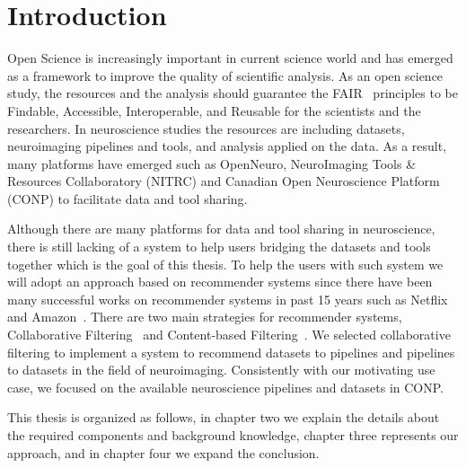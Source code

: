 \chapter{Introduction}
\label{introduction}


Open Science is increasingly important in current science world and has emerged as a framework to improve the quality of scientific analysis. As an open science study, the resources and the analysis should guarantee the FAIR~\cite{wilkinson2016fair} principles to be Findable, Accessible, Interoperable, and Reusable for the scientists and the researchers. In neuroscience studies the resources are including datasets, neuroimaging pipelines and tools, and analysis applied on the data. As a result, many platforms have emerged such as OpenNeuro, NeuroImaging Tools \& Resources Collaboratory (NITRC) and Canadian Open Neuroscience Platform (CONP) to facilitate data and tool sharing.

Although there are many platforms for data and tool sharing in neuroscience, there is still lacking of a system to help users  bridging the datasets and tools together which is the goal of this thesis. To help the users with such system we will adopt an approach based on recommender systems since there have been many successful works on recommender systems in past 15 years such as Netflix~\cite{bennett2007netflix} and Amazon~\cite{7927889}. There are two main strategies for recommender systems, Collaborative Filtering~\cite{rajaraman2011mining} and Content-based Filtering~\cite{pazzani2007content}. We selected collaborative filtering to implement a system to recommend datasets to pipelines and pipelines to datasets in the field of neuroimaging. Consistently with our motivating use case, we focused on the available neuroscience pipelines and datasets in CONP. 


This thesis is organized as follows, in chapter two we explain the details about the required components and background knowledge, chapter three represents our approach, and in chapter four we expand the conclusion. 


